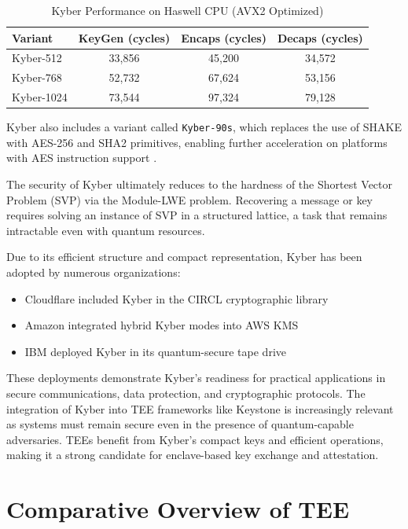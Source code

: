 \begin{table}[h]
\centering
\caption{Kyber Performance on Haswell CPU (AVX2 Optimized)}
\label{tab:kyber_perf}
\begin{tabular}{|l|c|c|c|}
\hline
\textbf{Variant} & \textbf{KeyGen (cycles)} & \textbf{Encaps (cycles)} & \textbf{Decaps (cycles)} \\
\hline
Kyber-512 & 33,856 & 45,200 & 34,572 \\
Kyber-768 & 52,732 & 67,624 & 53,156 \\
Kyber-1024 & 73,544 & 97,324 & 79,128 \\
\hline
\end{tabular}
\end{table}

Kyber also includes a variant called \texttt{Kyber-90s}, which replaces the use of SHAKE with AES-256 and SHA2 primitives, enabling further acceleration on platforms with AES instruction support \cite{kyber2024}. %

The security of Kyber ultimately reduces to the hardness of the Shortest Vector Problem (SVP) via the Module-LWE problem. Recovering a message or key requires solving an instance of SVP in a structured lattice, a task that remains intractable even with quantum resources\cite{kyber2021}. %

Due to its efficient structure and compact representation, Kyber has been adopted by numerous organizations:
\begin{itemize}
    \item Cloudflare included Kyber in the CIRCL cryptographic library
    \item Amazon integrated hybrid Kyber modes into AWS KMS
    \item IBM deployed Kyber in its quantum-secure tape drive
\end{itemize} %
These deployments demonstrate Kyber’s readiness for practical applications in secure communications, data protection, and cryptographic protocols. 
The integration of Kyber into TEE frameworks like Keystone is increasingly relevant as systems must remain secure even in the presence of quantum-capable adversaries. TEEs benefit from Kyber’s compact keys and efficient operations, making it a strong candidate for enclave-based key exchange and attestation.

\section{Comparative Overview of TEE}
\label{sec:comparison_tees}

